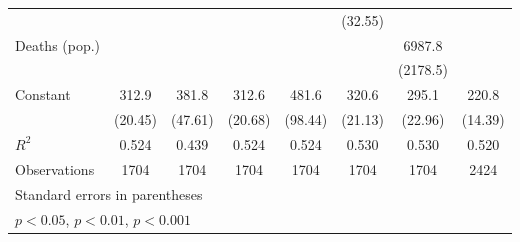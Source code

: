 \documentclass{article}
\begin{document}
{\begin{longtable}{l*{7}{c}}
                &                  &                  &                  &                  &  (32.55)         &                  &                  \\
Deaths (pop.)   &                  &                  &                  &                  &                  &   6987.8\sym{**} &                  \\
                &                  &                  &                  &                  &                  & (2178.5)         &                  \\
Constant        &    312.9\sym{***}&    381.8\sym{***}&    312.6\sym{***}&    481.6\sym{***}&    320.6\sym{***}&    295.1\sym{***}&    220.8\sym{***}\\
                &  (20.45)         &  (47.61)         &  (20.68)         &  (98.44)         &  (21.13)         &  (22.96)         &  (14.39)         \\
\hline
\(R^{2}\)       &    0.524         &    0.439         &    0.524         &    0.524         &    0.530         &    0.530         &    0.520         \\
Observations    &     1704         &     1704         &     1704         &     1704         &     1704         &     1704         &     2424         \\
\hline\hline
\multicolumn{8}{l}{\footnotesize Standard errors in parentheses}\\
\multicolumn{8}{l}{\footnotesize \sym{*} \(p<0.05\), \sym{**} \(p<0.01\), \sym{***} \(p<0.001\)}\\
\end{longtable}
}
\end{document}
